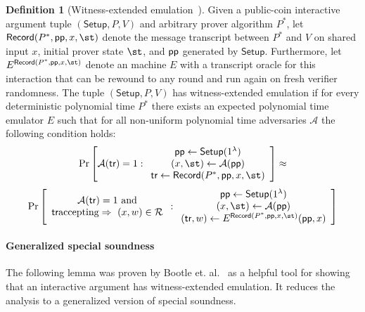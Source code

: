 \documentclass{article}
\theoremstyle{definition}
\newtheorem{definition}{Definition}
\newcommand{\alaninline}[1]{{\todo[color=blue!20!white, inline]{Alan: #1}}}
\newcommand{\alaninline}[1]{}
\begin{document}
\begin{definition}[Witness-extended emulation~\cite{EC:GroIsh08}]\label{def:wee}
Given a public-coin interactive argument tuple $(\textsf{Setup}, P, V)$ and arbitrary prover algorithm $P^*$, let $\textsf{Record}(P^*, \params, x, \st)$ denote the message transcript between $P^*$ and $V$ on shared input $x$, initial prover state $\st$, and $\textsf{pp}$ generated by $\textsf{Setup}$. Furthermore, let $E^{\textsf{Record}(P^*, \params, x, \st)}$ denote an machine $E$ with a transcript oracle for this interaction that can be rewound to any round and run again on fresh verifier randomness. The tuple $(\textsf{Setup}, P, V)$ has witness-extended emulation if for every deterministic polynomial time $P^*$ there exists an expected polynomial time emulator $E$ such that for all non-uniform polynomial time adversaries $\mathcal{A}$ the following condition holds: 
\[
\Pr \left[
\mathcal{A}(\textsf{tr}) = 1
:
\begin{array}{c}
             \params \leftarrow \textsf{Setup}(1^\lambda) \\
             (x, \st) \leftarrow \mathcal{A}(\params) \\
             \tr \leftarrow \textsf{Record}(P^*, \params, x, \st)
\end{array} 
\right] \approx
\]
\[
\Pr \left[
\begin{array}{c} 
\mathcal{A}(\textsf{tr}) = 1 \ \text{and} \\ 
\text{\tr accepting} \Rightarrow \ (x, w) \in \mathcal{R}
\end{array} 
:
\begin{array}{c}
             \params \leftarrow \textsf{Setup}(1^\lambda) \\
             (x, \st) \leftarrow \mathcal{A}(\params) \\
(\textsf{tr}, w) \leftarrow E^{\textsf{Record}(P^*, \params, x, \st)}(\params, x)
\end{array}
\right]
\]

\end{definition}


\paragraph{Generalized special soundness} The following lemma was proven by Bootle et. al.~\cite{EC:BCCGP16} as a helpful tool for showing that an interactive argument has witness-extended emulation. It reduces the analysis to a generalized version of special soundness. 
\end{document}
